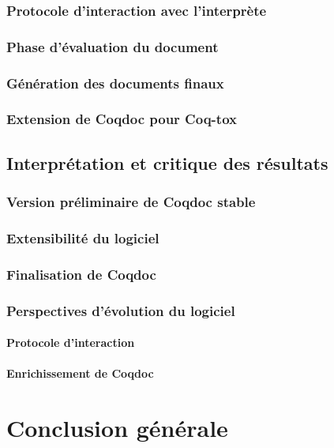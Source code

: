 \documentclass[a4paper, 11pt]{report}
\begin{document}
    \subsection{Protocole d'interaction avec l'interprète} %
    \subsection{Phase d'évaluation du document}
    \subsection{Génération des documents finaux}
    \subsection{Extension de Coqdoc pour Coq-tox}
  \section{Interprétation et critique des résultats}
    \subsection{Version préliminaire de Coqdoc stable}
    \subsection{Extensibilité du logiciel}
    \subsection{Finalisation de Coqdoc}
    \subsection{Perspectives d'évolution du logiciel}
    \subsubsection{Protocole d'interaction}
    \subsubsection{Enrichissement de Coqdoc}
\chapter{Conclusion générale}

\end{document}
